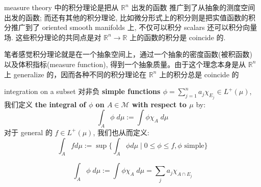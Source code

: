 \documentclass[lang=cn,11pt]{elegantbook}
\begin{document}
\begin{remark}
    measure theory 中的积分理论是把从 $\mathbb{R}^n$ 出发的函数 推广到了从抽象的测度空间出发的函数; 而还有其他的积分理论, 比如微分形式上的积分则是把实值函数的积分推广到了 oriented smooth manifolds 上, 不仅可以积分 scalars 还可以积分向量场. 这些积分理论的共同点是对 $\mathbb{R}^n\rightarrow \mathbb{R}$ 上的函数的积分是 coincide 的.

笔者感觉积分理论就是在一个抽象空间上，通过一个抽象的密度函数(被积函数) 以及体积指标(measure function), 得到一个抽象质量。由于这个理念本身是从 $\mathbb{R}^n$ 上 generalize 的，因而各种不同的积分理论在 $\mathbb{R}^n$ 上的积分总是 coincide 的
\end{remark}



\begin{definition}{integration on a subset}
    对非负 \textbf{simple functions $\phi = \sum_{j=1}^n a_j \chi_{E_j} \in L^+(\mu)$}, 我们定义 \textbf{the integral of $\phi$ on $A\in \mathcal{M}$ with respect to $\mu$} by:
$$
\int_A \phi \;d\mu  := \int \phi \chi_A \; d\mu
$$
对于 general 的 $f \in L^+(\mu)$, 我们也从而定义:
$$ \int_A  fd\mu  := \sup \{   \int_A \phi d\mu \mid 0\leq \phi \leq f, \phi  \text{ simple} \}$$
\end{definition}
\begin{remark}
$$
\int_A \phi \;d\mu  := \int \phi \chi_A \; d\mu = \sum_j a_j \chi_{A \cap E_j}
$$
\end{remark}
\end{document}
